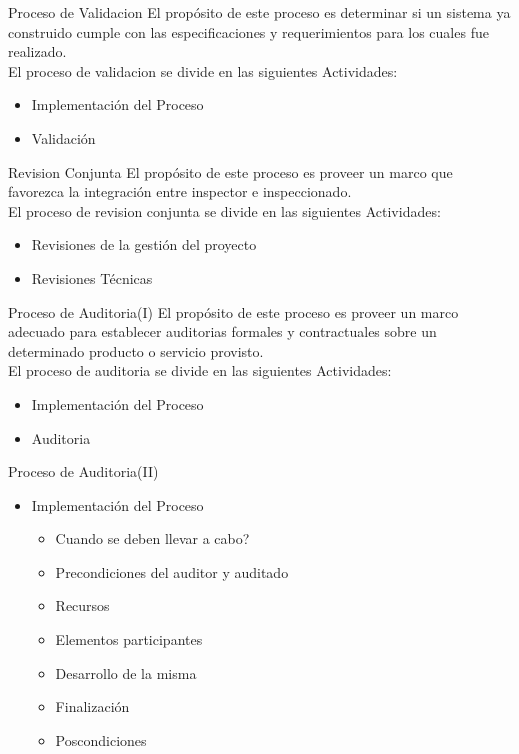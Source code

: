 \documentclass{beamer}
\begin{document}
				\begin{frame}{Proceso de Validacion}
					El propósito de este proceso es determinar si un sistema ya construido cumple con las especificaciones y requerimientos para los cuales fue realizado.\\
					
					El proceso de validacion se divide en las siguientes Actividades:
					\begin{itemize}
						\item Implementación del Proceso
						\item Validación
					\end{itemize}
				\end{frame}
			
				\begin{frame}{Revision Conjunta}
					El propósito de este proceso es proveer un marco que favorezca la integración entre inspector e inspeccionado.\\
					El proceso de revision conjunta se divide en las siguientes Actividades:
					\begin{itemize}
						\item Revisiones de la gestión del proyecto
						\item Revisiones Técnicas
					\end{itemize} 
				\end{frame}
			
				\begin{frame}{Proceso de Auditoria(I)}
					 El propósito de este proceso es proveer un marco adecuado para establecer auditorias formales y contractuales sobre un determinado producto o servicio provisto.\\
					 
					 El proceso de auditoria se divide en las siguientes Actividades:
					 \begin{itemize}
					 	\item Implementación del Proceso
						\item Auditoria
					 \end{itemize}
				\end{frame}
			
			\begin{frame}{Proceso de Auditoria(II)}
				\begin{itemize}
					\item Implementación del Proceso
					\begin{itemize}
						\item Cuando se deben llevar a cabo?
						\item Precondiciones del auditor y auditado
						\item Recursos
						\item Elementos participantes
						\item Desarrollo de la misma
						\item Finalización
						\item Poscondiciones
					\end{itemize}
				\end{itemize}
			\end{frame}
			
\end{document}
